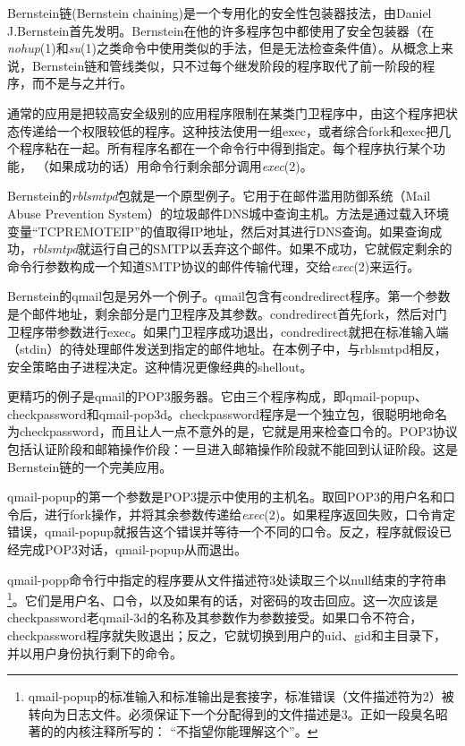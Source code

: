 \documentclass[12pt,oneside]{book}
\begin{document}
\begin{common-format}
Bernstein链(Bernstein  chaining)是一个专用化的安全性包装器技法，由Daniel J.Bernstein首先发明。Bernstein在他的许多程序包中都使用了安全包装器（在\textit{nohup}(1)和\textit{su}(1)之类命令中使用类似的手法，但是无法检查条件值）。从概念上来说，Bernstein链和管线类似，只不过每个继发阶段的程序取代了前一阶段的程序，而不是与之并行。

通常的应用是把较高安全级别的应用程序限制在某类门卫程序中，由这个程序把状态传递给一个权限较低的程序。这种技法使用一组exec，或者综合fork和exec把几个程序粘在一起。所有程序名都在一个命令行中得到指定。每个程序执行某个功能，  （如果成功的话）用命令行剩余部分调用\textit{exec}(2)。

Bernstein的\textit{rblsmtpd}包就是一个原型例子。它用于在邮件滥用防御系统（Mail Abuse Prevention System）的垃圾邮件DNS城中查询主机。方法是通过载入环境变量“TCPREMOTEIP”的值取得IP地址，然后对其进行DNS查询。如果查询成功，\textit{rblsmtpd}就运行自己的SMTP以丢弃这个邮件。如果不成功，它就假定剩余的命令行参数构成一个知道SMTP协议的邮件传输代理，交给\textit{exec}(2)来运行。

Bernstein的qmail包是另外一个例子。qmail包含有condredirect程序。第一个参数是个邮件地址，剩余部分是门卫程序及其参数。condredirect首先fork，然后对门卫程序带参数进行exec。如果门卫程序成功退出，condredirect就把在标准输入端（stdin）的待处理邮件发送到指定的邮件地址。在本例子中，与rblsmtpd相反，安全策略由子进程决定。这种情况更像经典的shellout。

更精巧的例子是qmail的POP3服务器。它由三个程序构成，即qmail-popup、checkpassword和qmail-pop3d。checkpassword程序是一个独立包，很聪明地命名为checkpassword，而且让人一点不意外的是，它就是用来检查口令的。POP3协议包括认证阶段和邮箱操作价段：一旦进入邮箱操作阶段就不能回到认证阶段。这是Bernstein链的一个完美应用。

qmail-popup的第一个参数是POP3提示中使用的主机名。取回POP3的用户名和口令后，进行fork操作，并将其余参数传递给\textit{exec}(2)。如果程序返回失败，口令肯定错误，qmail-popup就报告这个错误并等待一个不同的口令。反之，程序就假设已经完成POP3对话，qmail-popup从而退出。

qmail-popp命令行中指定的程序要从文件描述符3处读取三个以null结束的字符串\footnote{qmail-popup的标准输入和标准输出是套接字，标准错误（文件描述符为2）被转向为日志文件。必须保证下一个分配得到的文件描述是3。正如一段臭名昭著的的内核注释所写的：  “不指望你能理解这个”。}。它们是用户名、口令，以及如果有的话，对密码的攻击回应。这一次应该是checkpassword老qmail-3d的名称及其参数作为参数接受。如果口令不符合，checkpassword程序就失败退出；反之，它就切换到用户的uid、gid和主目录下，并以用户身份执行剩下的命令。


\end{common-format}
\end{document}
